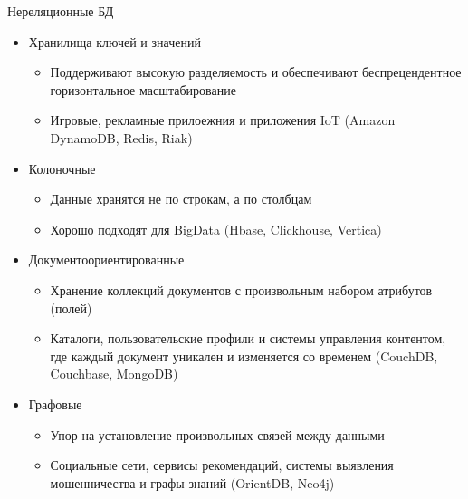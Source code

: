\documentclass[12pt]{article}
\begin{document}
\begin{defin}{Нереляционные БД}
    \begin{itemize}
        \item Хранилища ключей и значений 
        
        \begin{itemize}
            \item Поддерживают высокую разделяемость и обеспечивают беспрецендентное горизонтальное масштабирование 
            \item Игровые, рекламные прилоежния и приложения IoT (Amazon DynamoDB, Redis, Riak)
        \end{itemize}
        
        \item Колоночные
        
        \begin{itemize}
            \item Данные хранятся не по строкам, а по столбцам 
            \item Хорошо подходят для BigData (Hbase, Clickhouse, Vertica)
        \end{itemize}

        \item Документоориентированные 
        
        \begin{itemize}
            \item Хранение коллекций документов с произвольным набором атрибутов (полей)
            \item Каталоги, пользовательские профили и системы управления контентом, где каждый документ уникален и изменяется со временем (CouchDB, Couchbase, MongoDB)
        \end{itemize}

        \item Графовые
        
        \begin{itemize}
            \item Упор на установление произвольных связей между данными 
            \item Социальные сети, сервисы рекомендаций, системы выявления мошенничества и графы знаний (OrientDB, Neo4j)
        \end{itemize}
    \end{itemize}
\end{defin}
\end{document}
